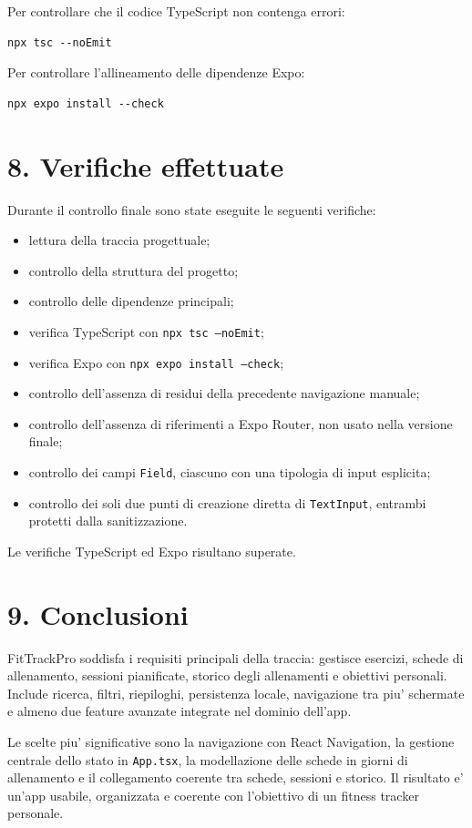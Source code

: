 \documentclass[11pt,a4paper]{article}
\begin{document}
Per controllare che il codice TypeScript non contenga errori:

\begin{lstlisting}
npx tsc --noEmit
\end{lstlisting}

Per controllare l'allineamento delle dipendenze Expo:

\begin{lstlisting}
npx expo install --check
\end{lstlisting}

\section{8. Verifiche effettuate}

Durante il controllo finale sono state eseguite le seguenti verifiche:

\begin{itemize}
  \item lettura della traccia progettuale;
  \item controllo della struttura del progetto;
  \item controllo delle dipendenze principali;
  \item verifica TypeScript con \texttt{npx tsc --noEmit};
  \item verifica Expo con \texttt{npx expo install --check};
  \item controllo dell'assenza di residui della precedente navigazione manuale;
  \item controllo dell'assenza di riferimenti a Expo Router, non usato nella versione finale;
  \item controllo dei campi \texttt{Field}, ciascuno con una tipologia di input esplicita;
  \item controllo dei soli due punti di creazione diretta di \texttt{TextInput}, entrambi protetti dalla sanitizzazione.
\end{itemize}

Le verifiche TypeScript ed Expo risultano superate.

\section{9. Conclusioni}

FitTrackPro soddisfa i requisiti principali della traccia: gestisce esercizi, schede di allenamento, sessioni pianificate, storico degli allenamenti e obiettivi personali. Include ricerca, filtri, riepiloghi, persistenza locale, navigazione tra piu' schermate e almeno due feature avanzate integrate nel dominio dell'app.

Le scelte piu' significative sono la navigazione con React Navigation, la gestione centrale dello stato in \texttt{App.tsx}, la modellazione delle schede in giorni di allenamento e il collegamento coerente tra schede, sessioni e storico. Il risultato e' un'app usabile, organizzata e coerente con l'obiettivo di un fitness tracker personale.
\end{document}
